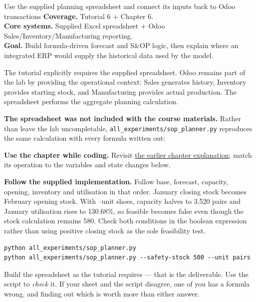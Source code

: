 
\begin{labproject}{Use the supplied planning spreadsheet and connect its inputs back to Odoo transactions}
\textbf{Coverage.} Tutorial 6 + Chapter 6.\\
\textbf{Core systems.} Supplied Excel spreadsheet + Odoo Sales/Inventory/Manufacturing reporting.\\
\textbf{Goal.} Build formula-driven forecast and S\&OP logic, then explain where an integrated ERP would supply the historical data used by the model.




\begin{labmode}
The tutorial explicitly requires the supplied spreadsheet. Odoo remains part of the lab by providing the operational context: Sales generates history, Inventory provides starting stock, and Manufacturing provides actual production. The spreadsheet performs the aggregate planning calculation.

\medskip
\textbf{The spreadsheet was not included with the course materials.} Rather than leave the lab uncompletable, \texttt{all\_experiments/sop\_planner.py} reproduces the same calculation with every formula written out:


\textbf{Use the chapter while coding.} Revisit \hyperref[ch:forecasting-sop]{the earlier chapter explanation}; match its operation to the variables and state changes below.

\textbf{Follow the supplied implementation.} Follow base, forecast, capacity, opening, inventory and utilisation in that order. January closing stock becomes February opening stock. With --unit shoes, capacity halves to 3,520 pairs and January utilisation rises to 130.68\%, so feasible becomes false even though the stock calculation remains 580. Check both conditions in the boolean expression rather than using positive closing stock as the sole feasibility test.


\begin{lstlisting}[style=utpterminal]
python all_experiments/sop_planner.py
python all_experiments/sop_planner.py --safety-stock 500 --unit pairs
\end{lstlisting}

Build the spreadsheet as the tutorial requires --- that is the deliverable. Use the script to \emph{check} it. If your sheet and the script disagree, one of you has a formula wrong, and finding out which is worth more than either answer.
\end{labmode}


\end{labproject}
